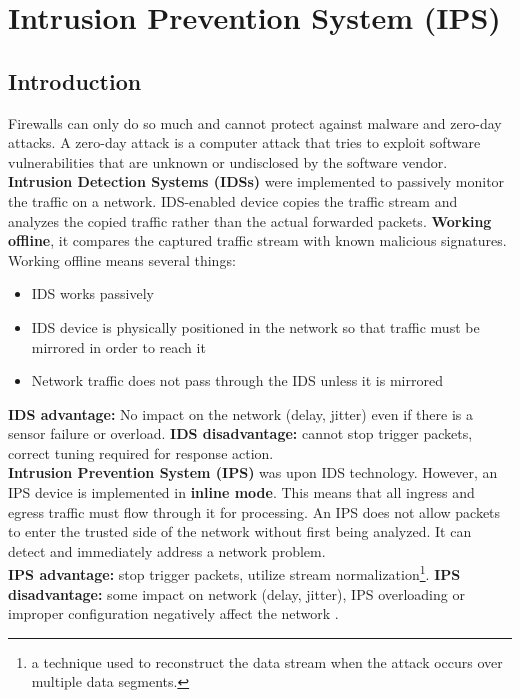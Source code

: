 \chapter{Intrusion Prevention System (IPS)}

\section{Introduction}

Firewalls can only do so much and cannot protect against malware and zero-day attacks. A zero-day attack is a computer attack that tries to exploit software vulnerabilities that are unknown or undisclosed by the software vendor. \\

\textbf{Intrusion Detection Systems (IDSs)} were implemented to passively monitor the traffic on a network. IDS-enabled device copies the traffic stream and analyzes the copied traffic rather than the actual forwarded packets. \textbf{Working offline}, it compares the captured traffic stream with known malicious signatures. Working offline means several things:

\begin{itemize}
\item IDS works passively
\item IDS device is physically positioned in the network so that traffic must be mirrored in order to reach it
\item Network traffic does not pass through the IDS unless it is mirrored
\end{itemize}

\textbf{IDS advantage:} No impact on the network (delay, jitter) even if there is a sensor failure or overload. \textbf{IDS disadvantage:} cannot stop trigger packets, correct tuning required for response action. \\

\textbf{Intrusion Prevention System (IPS)} was upon IDS technology. However, an IPS device is implemented in \textbf{inline mode}. This means that all ingress and egress traffic must flow through it for processing. An IPS does not allow packets to enter the trusted side of the network without first being analyzed. It can detect and immediately address a network problem. \\

\textbf{IPS advantage:} stop trigger packets, utilize stream normalization\footnote{a technique used to reconstruct the data stream when the attack occurs over multiple data segments.}. \textbf{IPS disadvantage:} some impact on network (delay, jitter), IPS overloading or improper configuration negatively affect the network .\\

